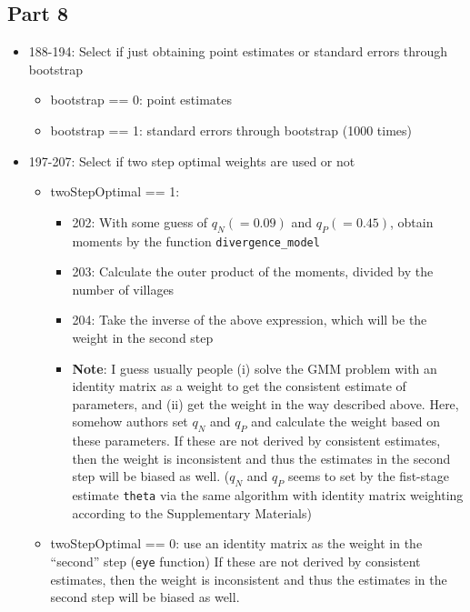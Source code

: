 \documentclass[10pt,letterpaper]{article}
\begin{document}
\begin{itemize}
\subsection*{Part 8}
\begin{itemize}
  \item 188-194: Select if just obtaining point estimates or standard errors through bootstrap
    \begin{itemize}
      \item bootstrap == 0: point estimates
      \item bootstrap == 1: standard errors through bootstrap (1000 times)
    \end{itemize}
  \item 197-207: Select if two step optimal weights are used or not
    \begin{itemize}
      \item twoStepOptimal == 1: 
        \begin{itemize}
          \item 202: With some guess of $q_N (= 0.09)$ and $q_P (= 0.45)$, obtain moments by the function \texttt{divergence\_model}
          \item 203: Calculate the outer product of the moments, divided by the number of villages
          \item 204: Take the inverse of the above expression, which will be the weight in the second step
          \item \textbf{Note}: I guess usually people 
            (i) solve the GMM problem with an identity matrix as a weight to get the consistent estimate of parameters, and 
            (ii) get the weight in the way described above.
            Here, somehow authors set $q_N$ and $q_P$ and calculate the weight based on these parameters.
            If these are not derived by consistent estimates, then the weight is inconsistent and thus the estimates in the second step will be biased as well. ($q_N$ and $q_P$ seems to set by the fist-stage estimate \texttt{theta} via the same algorithm with identity matrix weighting according to the Supplementary Materials)
        \end{itemize}
      \item twoStepOptimal == 0: use an identity matrix as the weight in the ``second'' step (\texttt{eye} function)
            If these are not derived by consistent estimates, then the weight is inconsistent and thus the estimates in the second step will be biased as well.
        \end{itemize}

\end{itemize}
\end{itemize}
\end{document}
